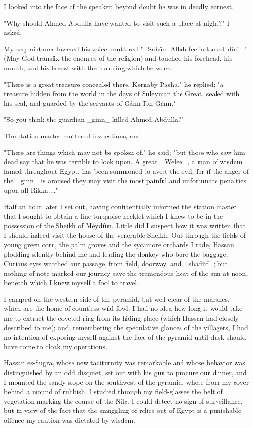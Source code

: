 I looked into the face of the speaker; beyond doubt he was in deadly
earnest.

"Why should Ahmed Abdulla have wanted to visit such a place at night?"
I asked.

My acquaintance lowered his voice, muttered "_Sahâm Allah fee 'adoo
ed--dîn!_" (May God transfix the enemies of the religion) and touched
his forehead, his mouth, and his breast with the iron ring which he
wore.

"There is a great treasure concealed there, Kernaby Pasha," he
replied; "a treasure hidden from the world in the days of Suleyman
the Great, sealed with his seal, and guarded by the servants of Gánn
Ibn-Gánn."

"So you think the guardian _ginn_ killed Ahmed Abdulla?"

The station master muttered invocations, and--

"There are things which may not be spoken of," he said; "but those who
saw him dead say that he was terrible to look upon. A great _Welee_, a
man of wisdom famed throughout Egypt, has been summoned to avert the
evil; for if the anger of the _ginn_ is aroused they may visit the
most painful and unfortunate penalties upon all Rikka...."

Half an hour later I set out, having confidentially informed the
station master that I sought to obtain a fine turquoise necklet which
I knew to be in the possession of the Sheikh of Méydûm. Little did I
suspect how it was written that I should indeed visit the house of the
venerable Sheikh. Out through the fields of young green corn, the palm
groves and the sycamore orchards I rode, Hassan plodding silently
behind me and leading the donkey who bore the baggage. Curious eyes
watched our passage, from field, doorway, and _shadûf_; but nothing of
note marked our journey save the tremendous heat of the sun at noon,
beneath which I knew myself a fool to travel.

I camped on the western side of the pyramid, but well clear of the
marshes, which are the home of countless wild-fowl. I had no idea how
long it would take me to extract the coveted ring from its
hiding-place (which Hassan had closely described to me); and,
remembering the speculative glances of the villagers, I had no
intention of exposing myself against the face of the pyramid until
dusk should have come to cloak my operations.

Hassan es-Sugra, whose new taciturnity was remarkable and whose
behavior was distinguished by an odd disquiet, set out with his gun to
procure our dinner, and I mounted the sandy slope on the southwest of
the pyramid, where from my cover behind a mound of rubbish, I studied
through my field-glasses the belt of vegetation marking the course of
the Nile. I could detect no sign of surveillance, but in view of the
fact that the smuggling of relics out of Egypt is a punishable offence
my caution was dictated by wisdom.

